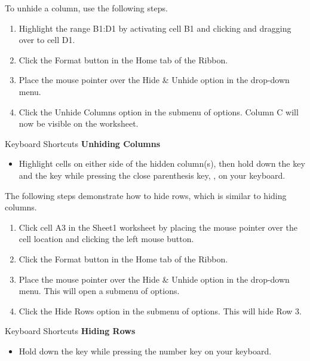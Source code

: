 To unhide a column, use the following steps.

\begin{enumerate}
	\item Highlight the range \textsf{B1:D1} by activating cell \textsf{B1} and clicking and dragging over to cell \textsf{D1}.
	\item Click the Format button in the Home tab of the Ribbon.
	\item Place the mouse pointer over the Hide \& Unhide option in the drop-down menu.
	\item Click the Unhide Columns option in the submenu of options. Column \textsf{C} will now be visible on the worksheet.
\end{enumerate}

\begin{center}
	\begin{shtcutbox}{Keyboard Shortcuts}
		\textbf{Unhiding Columns}
		\\
		\begin{itemize}
			\setlength{\itemsep}{0pt}
			\setlength{\parskip}{0pt}
			\setlength{\parsep}{0pt}
			
			\item Highlight cells on either side of the hidden column(s), then hold down the  key and the  key while pressing the close parenthesis key, \keystroke{)}, on your keyboard.
			
		\end{itemize}
	\end{shtcutbox}
\end{center}

The following steps demonstrate how to hide rows, which is similar to hiding columns.

\begin{enumerate}
	\item Click cell \textsf{A3} in the Sheet1 worksheet by placing the mouse pointer over the cell location and clicking the left mouse button.
	\item Click the Format button in the Home tab of the Ribbon.
	\item Place the mouse pointer over the Hide \& Unhide option in the drop-down menu. This will open a submenu of options.
	\item Click the Hide Rows option in the submenu of options. This will hide Row 3.
\end{enumerate}

\begin{center}
	\begin{shtcutbox}{Keyboard Shortcuts}
		\textbf{Hiding Rows}
		\\
		\begin{itemize}
			\setlength{\itemsep}{0pt}
			\setlength{\parskip}{0pt}
			\setlength{\parsep}{0pt}
			
			\item Hold down the  key while pressing the number  key on your keyboard.
			
		\end{itemize}
	\end{shtcutbox}
\end{center}

